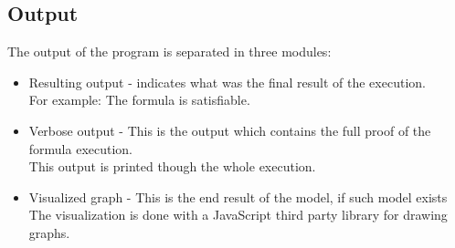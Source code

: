 \documentclass{article}
\begin{document}
		\subsection*{Output}
		The output of the program is separated in three modules:
		\begin{itemize}
			\item Resulting output - indicates what was the final result of the execution. \\
				For example: The formula is satisfiable.
			\item Verbose output - This is the output which contains the full proof of the formula execution. \\
				This output is printed though the whole execution.
			\item Visualized graph - This is the end result of the model, if such model exists \\
				The visualization is done with a JavaScript third party library for drawing graphs.
		\end{itemize}
\end{document}
